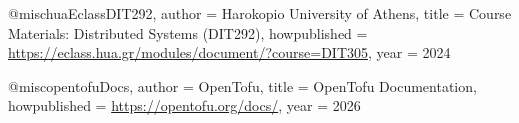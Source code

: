 @misc{huaEclassDIT292,
  author       = {{Harokopio University of Athens}},
  title        = {Course Materials: Distributed Systems (DIT292)},
  howpublished = {\url{https://eclass.hua.gr/modules/document/?course=DIT305}},
  year         = {2024}
}

@misc{opentofuDocs,
  author       = {{OpenTofu}},
  title        = {OpenTofu Documentation},
  howpublished = {\url{https://opentofu.org/docs/}},
  year         = {2026}
}